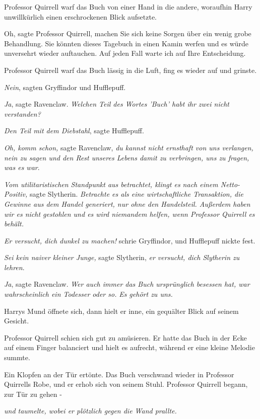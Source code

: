 Professor Quirrell warf das Buch von einer Hand in die andere, woraufhin Harry
unwillkürlich einen erschrockenen Blick aufsetzte.

\glqq{}Oh\grqq{}, sagte Professor Quirrell, \glqq{}machen Sie sich keine Sorgen
über ein wenig grobe Behandlung. Sie könnten dieses Tagebuch in einen Kamin
werfen und es würde unversehrt wieder auftauchen. Auf jeden Fall warte ich auf
Ihre Entscheidung.\grqq{}

Professor Quirrell warf das Buch lässig in die Luft, fing es wieder auf und
grinste.

\emph{Nein}, sagten Gryffindor und Hufflepuff.

\emph{Ja}, sagte Ravenclaw.
\emph{Welchen Teil des Wortes 'Buch' habt ihr zwei nicht verstanden?}

\emph{Den Teil mit dem Diebstahl}, sagte Hufflepuff.

\emph{Oh, komm schon,} sagte Ravenclaw, \emph{du kannst nicht ernsthaft von uns
verlangen, nein zu sagen und den Rest unseres Lebens damit zu verbringen, uns zu
fragen, was es war}.

\emph{Vom utilitaristischen Standpunkt aus betrachtet, klingt es nach einem
Netto-Positiv,} sagte Slytherin. \emph{Betrachte es als eine wirtschaftliche
Transaktion, die Gewinne aus dem Handel generiert, nur ohne den Handelsteil.
Außerdem haben wir es nicht gestohlen und es wird niemandem helfen, wenn
Professor Quirrell es behält.}

\emph{Er versucht, dich dunkel zu machen!} schrie Gryffindor, und Hufflepuff
nickte fest.

\emph{Sei kein naiver kleiner Junge,} sagte Slytherin, \emph{er versucht, dich
Slytherin zu lehren}.

\emph{Ja}, sagte Ravenclaw. \emph{Wer auch immer das Buch ursprünglich besessen
hat, war wahrscheinlich ein Todesser oder so.} \emph{Es gehört zu uns.}

Harrys Mund öffnete sich, dann hielt er inne, ein gequälter Blick auf seinem
Gesicht.

Professor Quirrell schien sich gut zu amüsieren. Er hatte das Buch in der Ecke
auf einem Finger balanciert und hielt es aufrecht, während er eine kleine
Melodie summte.

Ein Klopfen an der Tür ertönte. Das Buch verschwand wieder in Professor
Quirrells Robe, und er erhob sich von seinem Stuhl. Professor Quirrell begann,
zur Tür zu gehen -

\emph{und taumelte, wobei er plötzlich gegen die Wand prallte.}


